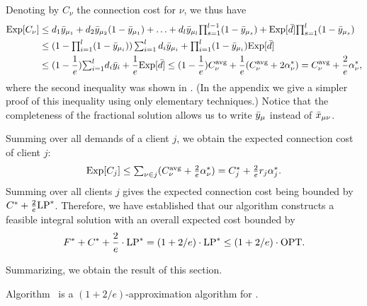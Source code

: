 Denoting by $C_\nu$ the connection cost for $\nu$, we thus have
%
\begin{align*}
  \mbox{\rm Exp}[C_\nu] &\leq d_1 {\bar y}_{\mu_1} + d_2 {\bar y}_{\mu_2}(1-{\bar y}_{\mu_1}) + \ldots
 		+  d_l {\bar y}_{\mu_l}\textstyle{\prod_{s=1}^{l-1}}(1-{\bar y}_{\mu_s}) 
		+  \mbox{\rm Exp}[{\bar d}]\textstyle{\prod_{s=1}^{l}} (1-{\bar y}_{\mu_s})
		\\
  &\leq (1-\textstyle{\prod_{i=1}^l} (1-{\bar y}_{\mu_i}))
  	\sum_{i=1}^l d_i{\bar y}_{\mu_i} + {\textstyle\prod_{i=1}^l} (1-\bar  y_{\mu_i})\mbox{\rm Exp}[{\bar d}]
	\\
  &\leq (1-\frac{1}{e}) {\textstyle\sum_{i=1}^l} d_i{\bar y}_i 
	+ \frac{1}{e} \mbox{\rm Exp}[{\bar d}] \leq (1-\frac{1}{e}) C^{{\mbox{\scriptsize\rm avg}}}_{\nu} 
	+	\frac{1}{e}	(C^{{\mbox{\scriptsize\rm avg}}}_{\nu} + 2\alpha_{\nu}^\ast) = C^{{\mbox{\scriptsize\rm avg}}}_{\nu} + \frac{2}{e}\alpha_{\nu}^\ast,
\end{align*}
%
where the second inequality was shown in
\cite{ChudakS04}. (In the appendix we give a simpler
proof of this inequality using only elementary techniques.)  Notice that the
completeness of the fractional solution allows us to write
${\bar y}_{\mu}$ instead of ${\bar x}_{\mu\nu}$.

Summing over all demands of a client $j$, we obtain the
expected connection cost of client $j$:
%
\begin{equation*}
  \mbox{\rm Exp}[C_j] \leq {\textstyle\sum_{\nu\in j} (C^{{\mbox{\scriptsize\rm avg}}}_{\nu} + \frac{2}{e}\alpha_{\nu}^\ast) }
  = \textstyle{ C_j^\ast + \frac{2}{e}r_j\alpha_j^\ast}.
\end{equation*}
%
Summing over all clients $j$ gives the expected connection
cost being bounded by $C^\ast +
\frac{2}{e}\mbox{\rm LP}^\ast$. Therefore, we have established that
our algorithm constructs a feasible integral solution with
an overall expected cost bounded by
%
\begin{equation*}
  \label{eq:chudakall}
  	F^\ast + C^\ast + \frac{2}{e}\cdot \mbox{\rm LP}^\ast = (1+2/e)\cdot \mbox{\rm LP}^\ast
  \leq (1+2/e)\cdot \mbox{\rm OPT}.
\end{equation*}

Summarizing, we obtain the result of this section.

\begin{theorem}\label{thm:1736}
  Algorithm~{\ECHS} is a $(1+2/e)$-approximation algorithm for \FTFP.
\end{theorem}